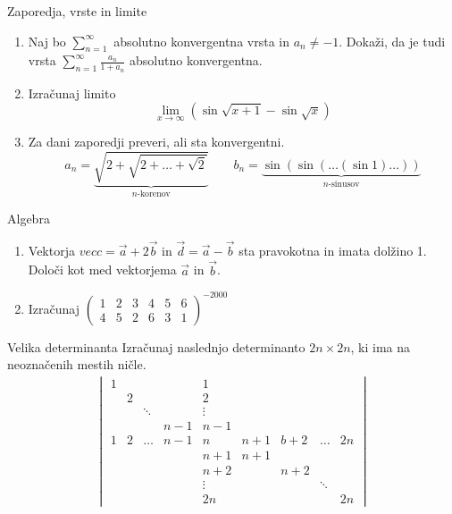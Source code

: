 \begin{frame}{Zaporedja, vrste in limite}
	\begin{enumerate}
		\item 
		Naj bo \(\sum_{n=1}^{\infty}\) absolutno konvergentna vrsta in $a_n \ne -1$.
		Dokaži, da je tudi vrsta $\sum_{n=1}^\infty \frac{a_n}{1+a_n}$
		absolutno konvergentna.

		\item
		Izračunaj limito
		\[\lim_{x \rightarrow \infty}(\sin\sqrt{x+1}-\sin\sqrt{x})\]

		\item
		Za dani zaporedji preveri, ali sta konvergentni.
		\[
		a_n = \underbrace{\sqrt{2+\sqrt{2+\dots+\sqrt{2}}}}_\text{$n$-korenov} \qquad
		b_n = \underbrace{\sin(\sin(\dots(\sin 1)\dots))}_\text{$n$-sinusov}
		\]
	\end{enumerate}
\end{frame}

\begin{frame}{Algebra}
	\begin{enumerate}
		\item
		Vektorja \(vec{c} = \vec{a} + 2\vec{b}\) in \(\vec{d} = \vec{a} - \vec{b}\)
		sta pravokotna in imata dolžino 1. Določi kot med vektorjema $\vec{a}$ in $\vec{b}$.
		\item 
		Izračunaj
		$
		\begin{pmatrix}
			1&2&3&4&5&6 \\
			4&5&2&6&3&1
		\end{pmatrix}^{-2000}
		$
	\end{enumerate}
\end{frame}

\begin{frame}{Velika determinanta}
	Izračunaj naslednjo determinanto $2n \times 2n$, ki ima na neoznačenih mestih ničle.
	\begin{align*}
	\begin{vmatrix}
		1& & & &1& & & & \\
		 &2& & &2& & & & \\
		 & &\ddots& &\vdots & & & & \\
		 & & &n-1&n-1& & & & \\
		1&2&\dots &n-1&n&n+1&b+2&\dots &2n \\
		 & & & &n+1&n+1& & & \\
		 & & & &n+2& &n+2& & \\
		 & & & &\vdots& & &\ddots& \\
		 & & & &2n& & & &2n 
	\end{vmatrix}
	\end{align*}
\end{frame}

